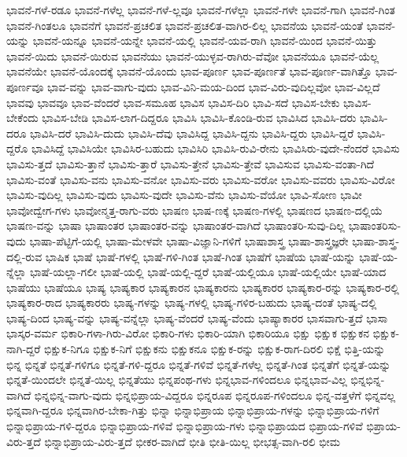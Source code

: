 {ಭಾವನೆ-ಗಳೆ-ರಡೂ
ಭಾವನೆ-ಗಳೆಲ್ಲ
ಭಾವನೆ-ಗಳೆ-ಲ್ಲವೂ
ಭಾವನೆ-ಗಳೆಲ್ಲಾ
ಭಾವನೆ-ಗಳೇ
ಭಾವನೆ-ಗಾಗಿ
ಭಾವನೆ-ಗಿಂತ
ಭಾವನೆ-ಗಿಂತಲೂ
ಭಾವನೆಗೆ
ಭಾವನೆ-ಪ್ರಚಲಿತ
ಭಾವನೆ-ಪ್ರಚಲಿತ-ವಾಗಿರ-ಲಿಲ್ಲ
ಭಾವನೆಯ
ಭಾವನೆ-ಯಂತೆ
ಭಾವನೆ-ಯನ್ನು
ಭಾವನೆ-ಯನ್ನೂ
ಭಾವನೆ-ಯನ್ನೇ
ಭಾವನೆ-ಯಲ್ಲಿ
ಭಾವನೆ-ಯವ-ರಾಗಿ
ಭಾವನೆ-ಯಿಂದ
ಭಾವನೆ-ಯಿತ್ತು
ಭಾವನೆ-ಯಿದು
ಭಾವನೆ-ಯಿರುವ
ಭಾವನೆಯು
ಭಾವನೆ-ಯುಳ್ಳವ-ರಾಗಿರು-ವೆವೋ
ಭಾವನೆಯೂ
ಭಾವನೆ-ಯೆಲ್ಲ
ಭಾವನೆಯೇ
ಭಾವನೆ-ಯೊಂದಕ್ಕೆ
ಭಾವನೆ-ಯೊಂದು
ಭಾವ-ಪೂರ್ಣ
ಭಾವ-ಪೂರ್ಣತೆ
ಭಾವ-ಪೂರ್ಣ-ವಾಗಿತ್ತೊ
ಭಾವ-ಪೂರ್ಣವೂ
ಭಾವ-ವನ್ನು
ಭಾವ-ವಾಗು-ವುದು
ಭಾವ-ವಿನಿ-ಮಯ-ದಿಂದ
ಭಾವ-ವಿರು-ವುದಿಲ್ಲವೋ
ಭಾವ-ವಿಲ್ಲದೆ
ಭಾವವು
ಭಾವವೂ
ಭಾವ-ವೆಂದರೆ
ಭಾವ-ಸಮೂಹ
ಭಾವಿಸ
ಭಾವಿಸ-ದಿರಿ
ಭಾವಿ-ಸದೆ
ಭಾವಿಸ-ಬೇಕು
ಭಾವಿಸ-ಬೇಕೆಂದು
ಭಾವಿಸ-ಬೇಡಿ
ಭಾವಿಸ-ಲಾಗ-ದಿದ್ದರೂ
ಭಾವಿಸಿ
ಭಾವಿಸಿ-ಕೊಂಡಿ-ರುವ
ಭಾವಿಸಿದ
ಭಾವಿಸಿ-ದರು
ಭಾವಿಸಿ-ದರೂ
ಭಾವಿಸಿ-ದರೆ
ಭಾವಿಸಿ-ದುದು
ಭಾವಿಸಿ-ದೆವು
ಭಾವಿಸಿದ್ದ
ಭಾವಿಸಿ-ದ್ದನು
ಭಾವಿಸಿ-ದ್ದರು
ಭಾವಿಸಿ-ದ್ದರೆ
ಭಾವಿಸಿ-ದ್ದರೊ
ಭಾವಿಸಿದ್ದೆ
ಭಾವಿಸಿಯೇ
ಭಾವಿಸಿರ-ಬಹುದು
ಭಾವಿಸಿರಿ
ಭಾವಿಸಿ-ರುವಿ-ರೇನು
ಭಾವಿಸಿರು-ವುದೇ-ನೆಂದರೆ
ಭಾವಿಸು
ಭಾವಿಸು-ತ್ತದೆ
ಭಾವಿಸು-ತ್ತಾನೆ
ಭಾವಿಸು-ತ್ತಾರೆ
ಭಾವಿಸು-ತ್ತೇನೆ
ಭಾವಿಸು-ತ್ತೇವೆ
ಭಾವಿಸುವ
ಭಾವಿಸು-ವಂತಾ-ಗಿದೆ
ಭಾವಿಸು-ವಂತೆ
ಭಾವಿಸು-ವನು
ಭಾವಿಸು-ವನೋ
ಭಾವಿಸು-ವರು
ಭಾವಿಸು-ವರೋ
ಭಾವಿಸು-ವವರು
ಭಾವಿಸು-ವಿರೋ
ಭಾವಿಸು-ವುದಿಲ್ಲ
ಭಾವಿಸು-ವುದು
ಭಾವಿಸು-ವುದೇ
ಭಾವಿಸು-ವೆನು
ಭಾವಿಸು-ವೆಯೋ
ಭಾವಿ-ಸೋಣ
ಭಾವೀ
ಭಾವೋದ್ವೇಗ-ಗಳು
ಭಾವೋನ್ಮತ್ತ-ರಾಗು-ವರು
ಭಾಷಣ
ಭಾಷ-ಣಕ್ಕೆ
ಭಾಷಣ-ಗಳಲ್ಲಿ
ಭಾಷಣದ
ಭಾಷಣ-ದಲ್ಲಿಯೆ
ಭಾಷಣ-ವನ್ನು
ಭಾಷಾ
ಭಾಷಾಂತರ
ಭಾಷಾಂತರ-ವನ್ನು
ಭಾಷಾಂತರ-ವಾಗಿದೆ
ಭಾಷಾಂತರಿ-ಸುವು-ದಿಲ್ಲ
ಭಾಷಾಂತರಿಸು-ವುದು
ಭಾಷಾ-ಪೆಟ್ಟಿಗೆ-ಯಲ್ಲಿ
ಭಾಷಾ-ಮೇಳವೇ
ಭಾಷಾ-ವಿಜ್ಞಾನಿ-ಗಳಿಗೆ
ಭಾಷಾಶಾಸ್ತ್ರ
ಭಾಷಾ-ಶಾಸ್ತ್ರಜ್ಞರೇ
ಭಾಷಾ-ಶಾಸ್ತ್ರ-ದಲ್ಲಿ-ರುವ
ಭಾಷಿಕ
ಭಾಷೆ
ಭಾಷೆ-ಗಳಲ್ಲಿ
ಭಾಷೆ-ಗಳಿ-ಗಿಂತ
ಭಾಷೆ-ಗಿಂತ
ಭಾಷೆಗೆ
ಭಾಷೆಯ
ಭಾಷೆ-ಯನ್ನು
ಭಾಷೆ-ಯ-ನ್ನೆಲ್ಲಾ
ಭಾಷೆ-ಯಲ್ಲಾ-ಗಲೀ
ಭಾಷೆ-ಯಲ್ಲಿ
ಭಾಷೆ-ಯಲ್ಲಿ-ದ್ದರೆ
ಭಾಷೆ-ಯಲ್ಲಿಯೂ
ಭಾಷೆ-ಯಲ್ಲಿಯೇ
ಭಾಷೆ-ಯಾದ
ಭಾಷೆಯು
ಭಾಷೆಯೂ
ಭಾಷ್ಯ
ಭಾಷ್ಯಕಾರ
ಭಾಷ್ಯಕಾರನ
ಭಾಷ್ಯಕಾರನು
ಭಾಷ್ಯಕಾರರ
ಭಾಷ್ಯಕಾರ-ರನ್ನು
ಭಾಷ್ಯಕಾರ-ರಲ್ಲಿ
ಭಾಷ್ಯಕಾರ-ರಾದ
ಭಾಷ್ಯಕಾರರು
ಭಾಷ್ಯ-ಗಳನ್ನು
ಭಾಷ್ಯ-ಗಳಲ್ಲಿ
ಭಾಷ್ಯ-ಗಳಿರ-ಬಹುದು
ಭಾಷ್ಯ-ದಂತೆ
ಭಾಷ್ಯ-ದಲ್ಲಿ
ಭಾಷ್ಯ-ದಿಂದ
ಭಾಷ್ಯ-ವನ್ನು
ಭಾಷ್ಯ-ವನ್ನೆಲ್ಲಾ
ಭಾಷ್ಯ-ವೆಂದರೆ
ಭಾಷ್ಯ-ವೆಂದು
ಭಾಷ್ಯಾಕಾರರ
ಭಾಸವಾಗು-ತ್ತದೆ
ಭಾಸಾ
ಭಾಸ್ಕರ-ವರ್ಮ
ಭಿಕಾರಿ-ಗಳಾ-ಗಿರು-ವಿರೋ
ಭಿಕಾರಿ-ಗಳು
ಭಿಕಾರಿ-ಯಾಗಿ
ಭಿಕಾರಿಯೂ
ಭಿಕ್ಷು
ಭಿಕ್ಷುಕ
ಭಿಕ್ಷುಕನ
ಭಿಕ್ಷುಕ-ನಾಗಿ-ದ್ದರೆ
ಭಿಕ್ಷುಕ-ನಿಗೂ
ಭಿಕ್ಷುಕ-ನಿಗೆ
ಭಿಕ್ಷುಕನು
ಭಿಕ್ಷುಕನೂ
ಭಿಕ್ಷುಕ-ರನ್ನು
ಭಿಕ್ಷುಕ-ರಾಗ-ದಿರಲಿ
ಭಿಕ್ಷೆ
ಭಿತ್ತಿ-ಯನ್ನು
ಭಿನ್ನ
ಭಿನ್ನತೆ
ಭಿನ್ನತೆ-ಗಳಿಗೂ
ಭಿನ್ನತೆ-ಗಳಿ-ದ್ದರೂ
ಭಿನ್ನತೆ-ಗಳಿವೆ
ಭಿನ್ನತೆ-ಗಳೆಲ್ಲ
ಭಿನ್ನತೆ-ಗಿಂತ
ಭಿನ್ನತೆಗೆ
ಭಿನ್ನತೆ-ಯನ್ನು
ಭಿನ್ನತೆ-ಯಿಂದಲೇ
ಭಿನ್ನತೆ-ಯಿಲ್ಲ
ಭಿನ್ನತೆಯು
ಭಿನ್ನಪಂಥ-ಗಳು
ಭಿನ್ನಭಾವ-ಗಳಿಂದಲೂ
ಭಿನ್ನಭಾವ-ವಿಲ್ಲ
ಭಿನ್ನಭಿನ್ನ-ವಾಗಿದೆ
ಭಿನ್ನಭಿನ್ನ-ವಾಗು-ವುದು
ಭಿನ್ನಭಿಪ್ರಾಯ-ವಿದ್ದರೂ
ಭಿನ್ನರೂಪ
ಭಿನ್ನರೂಪ-ಗಳಿಂದಲೂ
ಭಿನ್ನ-ವತ್ತಳೆಗೆ
ಭಿನ್ನವಲ್ಲ
ಭಿನ್ನವಾಗಿ-ದ್ದರೂ
ಭಿನ್ನವಾಗಿರ-ಬೇಕಾ-ಗಿತ್ತು
ಭಿನ್ನಾ
ಭಿನ್ನಾಭಿಪ್ರಾಯ
ಭಿನ್ನಾಭಿಪ್ರಾಯ-ಗಳನ್ನು
ಭಿನ್ನಾಭಿಪ್ರಾಯ-ಗಳಿಗೆ
ಭಿನ್ನಾಭಿಪ್ರಾಯ-ಗಳಿ-ದ್ದರೂ
ಭಿನ್ನಾಭಿಪ್ರಾಯ-ಗಳಿವೆ
ಭಿನ್ನಾಭಿಪ್ರಾಯ-ಗಳು
ಭಿನ್ನಾಭಿಪ್ರಾಯದ
ಭಿಪ್ರಾಯ-ಗಳಿವೆ
ಭಿಪ್ರಾಯ-ವಿರು-ತ್ತದೆ
ಭಿನ್ನಾಭಿಪ್ರಾಯ-ವಿರು-ತ್ತದೆ
ಭೀಕರ-ವಾಗಿದೆ
ಭೀತಿ
ಭೀತಿ-ಯಿಲ್ಲ
ಭೀಭತ್ಸ-ವಾಗಿ-ರಲಿ
ಭೀಮ
}
